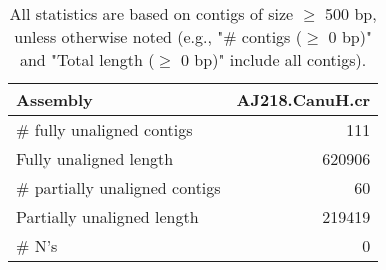 \documentclass[12pt,a4paper]{article}
\begin{document}
\begin{table}[ht]
\begin{center}
\caption{All statistics are based on contigs of size $\geq$ 500 bp, unless otherwise noted (e.g., "\# contigs ($\geq$ 0 bp)" and "Total length ($\geq$ 0 bp)" include all contigs).}
\begin{tabular}{|l*{1}{|r}|}
\hline
Assembly & AJ218.CanuH.cr \\ \hline
\# fully unaligned contigs & 111 \\ \hline
Fully unaligned length & 620906 \\ \hline
\# partially unaligned contigs & 60 \\ \hline
Partially unaligned length & 219419 \\ \hline
\# N's & 0 \\ \hline
\end{tabular}
\end{center}
\end{table}
\end{document}
